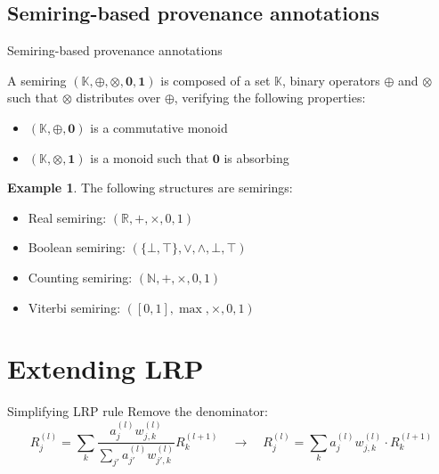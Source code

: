 \documentclass[aspectratio=169]{beamer}
\theoremstyle{definition}
\newtheorem*{exemple}{Example}
\begin{document}
\subsection{Semiring-based provenance annotations}
\begin{frame}{Semiring-based provenance annotations}
    \begin{definition}[Semiring]
        A semiring $(\mathbb{K}, \oplus, \otimes, \mathbf{0}, \mathbf{1})$ is composed of a set $\mathbb{K}$, binary operators $\oplus$ and $\otimes$ such that $\otimes$ distributes over $\oplus$, verifying the following properties:
        \begin{itemize}[label=--, noitemsep]
            \item $(\mathbb{K}, \oplus, \mathbf{0})$ is a commutative monoid
            \item $(\mathbb{K}, \otimes, \mathbf{1})$ is a monoid such that $\mathbf{0}$ is absorbing
        \end{itemize}
    \end{definition}

    \begin{exemple}
        The following structures are semirings:
        \begin{itemize}[label=--, noitemsep]
            \item Real semiring: $(\mathbb{R}, +, \times, 0, 1)$
            \item Boolean semiring: $(\{\bot, \top\}, \lor, \land, \bot, \top)$
            \item Counting semiring: $(\mathbb{N}, +, \times, 0, 1)$
            \item Viterbi semiring: $([0, 1], \max, \times, 0, 1)$
        \end{itemize}
    \end{exemple}
\end{frame}

\section{Extending LRP}
\begin{frame}{Simplifying LRP rule}
    Remove the denominator:
    \begin{equation*}
        R^{(l)}_j = \sum_k\frac{a^{(l)}_jw_{j, k}^{(l)}}{\sum_{j'}a^{(l)}_{j'}w_{j', k}^{(l)}} R^{(l+1)}_k \quad \longrightarrow \quad R^{(l)}_j = \sum_{k} a^{(l)}_jw_{j, k}^{(l)} \cdot R^{(l+1)}_k
    \end{equation*}
\end{frame}
\end{document}
